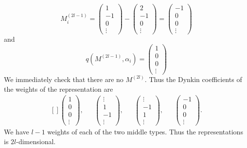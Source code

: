\begin{equation}
			M^{(2l-1)}_i=
\begin{pmatrix}
1\\-1\\0\\\vdots
\end{pmatrix}
-
\begin{pmatrix}
2\\-1\\0\\\vdots
\end{pmatrix}=
\begin{pmatrix}
-1\\0\\0\\\vdots
\end{pmatrix}
\end{equation}
and
\begin{equation}
q(M^{(2l-1)},\alpha_i)
=
\begin{pmatrix}
1\\0\\0\\\vdots
\end{pmatrix}
\end{equation}
We immediately check that there are no $M^{(2l)}$. Thus the Dynkin coefficients of the weights of the representation are
\begin{equation}
	\begin{aligned}[]
		\begin{pmatrix}
1\\0\\0\\\vdots
\end{pmatrix},&&
\begin{pmatrix}
\vdots\\1\\-1\\\vdots
\end{pmatrix},&&
\begin{pmatrix}
\vdots\\-1\\1\\\vdots
\end{pmatrix},&&
\begin{pmatrix}
-1\\0\\0\\\vdots
\end{pmatrix}.
	\end{aligned}
\end{equation}
We have $l-1$ weights of each of the two middle types. Thus the representations is $2l$-dimensional.
